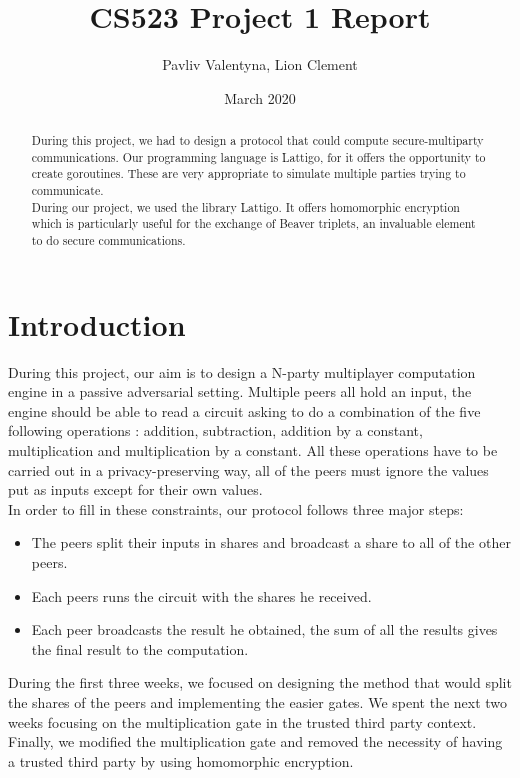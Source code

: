 \documentclass[10pt,conference,compsocconf]{IEEEtran}
\title{CS523 Project 1 Report}
\author{Pavliv Valentyna, Lion Clement}
\date{March 2020}
\begin{document}
\maketitle

\begin{abstract}
	During this project, we had to design a protocol that could compute secure-multiparty communications\cite{article}. Our programming language is Lattigo, for it offers the opportunity to create goroutines. These are very appropriate to simulate multiple parties trying to communicate.\\
	During our project, we used the library Lattigo\cite{lattigo}. It offers homomorphic encryption which is particularly useful for the exchange of Beaver triplets, an invaluable element to do secure communications.\\
\end{abstract}
\section{Introduction}

During this project, our aim is to design a N-party multiplayer computation engine in a passive adversarial setting. Multiple peers all hold an input, the engine should be able to read a circuit asking to do a combination of the five following operations : addition, subtraction, addition by a constant, multiplication and multiplication by a constant. 
All these operations have to be carried out in a privacy-preserving way, all of the peers must ignore the values put as inputs except for their own values.\\

In order to fill in these constraints, our protocol follows three major steps:
\begin{itemize}
	\item The peers split their inputs in shares and broadcast a share to all of the other peers.
	\item Each peers runs the circuit with the shares he received.
	\item Each peer broadcasts the result he obtained, the sum of all the results gives the final result to the computation.
\end{itemize}

During the first three weeks, we focused on designing the method that would split the shares of the peers and implementing the easier gates. We spent the next two weeks focusing on the multiplication gate in the trusted third party context. Finally, we modified the multiplication gate and removed the necessity of having a trusted third party by using homomorphic encryption.
\end{document}
